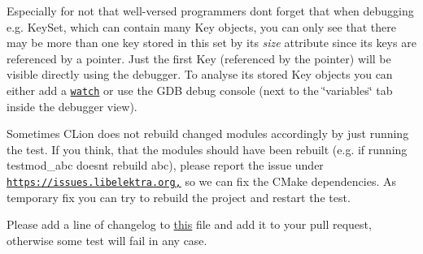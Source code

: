 \begin{DoxyItemize}
\item Especially for not that well-\/versed programmers don\textquotesingle{}t forget that when debugging e.\+g. {\ttfamily Key\+Set}, which can contain many {\ttfamily Key} objects, you can only see that there may be more than one key stored in this set by it\textquotesingle{}s {\itshape size} attribute since it\textquotesingle{}s keys are referenced by a pointer. Just the first {\ttfamily Key} (referenced by the pointer) will be visible directly using the debugger. To analyse it\textquotesingle{}s stored {\ttfamily Key} objects you can either add a \href{https://www.jetbrains.com/help/clion/debug-tool-window-watches.html}{\tt watch} or use the G\+DB debug console (next to the \char`\"{}variables\char`\"{} tab inside the debugger view).
\item Sometimes C\+Lion does not rebuild changed modules accordingly by just running the test. If you think, that the modules should have been rebuilt (e.\+g. if running {\ttfamily testmod\+\_\+abc} doesn\textquotesingle{}t rebuild abc), please report the issue under \href{https://issues.libelektra.org,}{\tt https\+://issues.\+libelektra.\+org,} so we can fix the C\+Make dependencies. As temporary fix you can try to rebuild the project and restart the test.
\item Please add a line of changelog to \hyperlink{doc_news__preparation_next_release_md}{this} file and add it to your pull request, otherwise some test will fail in any case. 
\end{DoxyItemize}